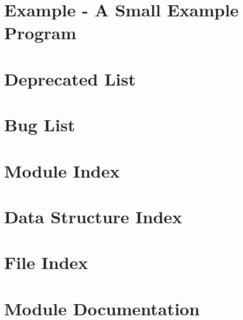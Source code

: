 \documentclass[twoside]{book}
\newcommand{\+}{\discretionary{\mbox{\scriptsize$\hookleftarrow$}}{}{}}
\begin{document}
\chapter{Example -\/ A Small Example Program}
\label{mp_example}
\hypertarget{mp_example}{}

\chapter{Deprecated List}
\label{deprecated}
\hypertarget{deprecated}{}

\chapter{Bug List}
\label{bug}
\hypertarget{bug}{}

\chapter{Module Index}

\chapter{Data Structure Index}

\chapter{File Index}

\chapter{Module Documentation}




















































\end{document}
